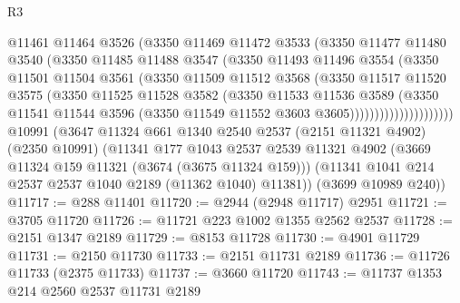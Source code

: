 \begin{lexlean}{R3}
\begin{coremodule}
                        @11461
                        @11464
                        @3526
                        (@3350
                          @11469
                          @11472
                          @3533
                          (@3350
                            @11477
                            @11480
                            @3540
                            (@3350
                              @11485
                              @11488
                              @3547
                              (@3350
                                @11493
                                @11496
                                @3554
                                (@3350
                                  @11501
                                  @11504
                                  @3561
                                  (@3350
                                    @11509
                                    @11512
                                    @3568
                                    (@3350
                                      @11517
                                      @11520
                                      @3575
                                      (@3350
                                        @11525
                                        @11528
                                        @3582
                                        (@3350
                                          @11533
                                          @11536
                                          @3589
                                          (@3350
                                            @11541
                                            @11544
                                            @3596
                                            (@3350 @11549 @11552 @3603 @3605)))))))))))))))))))))
    @10991
    (@3647
      @11324
      @661
      @1340
      @2540
      @2537
      (@2151 @11321 @4902)
      (@2350 @10991)
      (@11341
        @177
        @1043
        @2537
        @2539
        @11321
        @4902
        (@3669 @11324 @159 @11321 (@3674 (@3675 @11324 @159)))
        (@11341 @1041 @214 @2537 @2537 @1040 @2189 (@11362 @1040) @11381))
      (@3699 @10989 @240))
@11717 := @288 @11401
@11720 := @2944 (@2948 @11717) @2951
@11721 := @3705 @11720
@11726 := @11721 @223 @1002 @1355 @2562 @2537
@11728 := @2151 @1347 @2189
@11729 := @8153 @11728
@11730 := @4901 @11729
@11731 := @2150 @11730
@11733 := @2151 @11731 @2189
@11736 := @11726 @11733 (@2375 @11733)
@11737 := @3660 @11720
@11743 := @11737 @1353 @214 @2560 @2537 @11731 @2189

\end{coremodule}
\end{lexlean}
